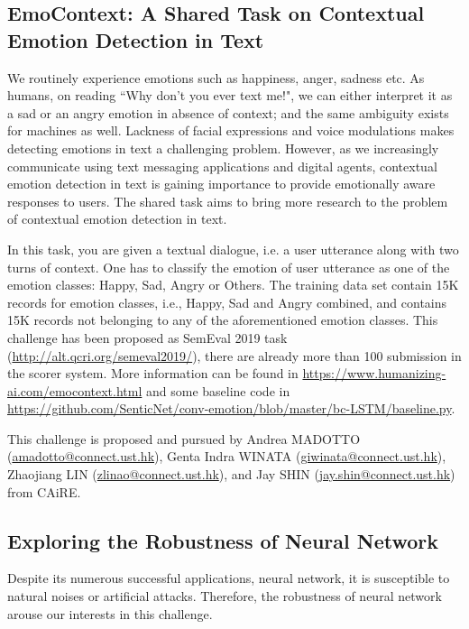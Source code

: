 \documentclass[11pt]{article}
\begin{document}
\subsection{EmoContext: A Shared Task on Contextual Emotion Detection in Text}
We routinely experience emotions such as happiness, anger, sadness etc. As humans, on reading ``Why don't you ever text me!", we can either interpret it as a sad or an angry emotion in absence of context; and the same ambiguity exists for machines as well. Lackness of facial expressions and voice modulations makes detecting emotions in text a challenging problem. However, as we increasingly communicate using text messaging applications and digital agents, contextual emotion detection in text is gaining importance to provide emotionally aware responses to users. The shared task aims to bring more research to the problem of contextual emotion detection in text. 

In this task, you are given a textual dialogue, i.e. a user utterance along with two turns of context. One has to classify the emotion of user utterance as one of the emotion classes: Happy, Sad, Angry or Others. The training data set contain 15K records for emotion classes, i.e., Happy, Sad and Angry combined, and contains 15K records not belonging to any of the aforementioned emotion classes. This challenge has been proposed as SemEval 2019 task (\url{http://alt.qcri.org/semeval2019/}), there are already more than 100 submission in the scorer system. More information can be found in \url{https://www.humanizing-ai.com/emocontext.html} and some baseline code in \url{https://github.com/SenticNet/conv-emotion/blob/master/bc-LSTM/baseline.py}.

This challenge is proposed and pursued by Andrea MADOTTO (\url{amadotto@connect.ust.hk}), Genta Indra WINATA (\url{giwinata@connect.ust.hk}), Zhaojiang LIN (\url{zlinao@connect.ust.hk}), and Jay SHIN (\url{jay.shin@connect.ust.hk}) from CAiRE. 

\subsection{Exploring the Robustness of Neural Network}
Despite its numerous successful applications, neural network, it is susceptible to natural noises or artificial attacks. Therefore, the robustness of neural network arouse our interests in this challenge.
\end{document}
